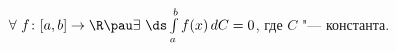 
	$\forall\  f\colon [a,b]\to\R\pau\exists\ \ds\int\limits_a^bf(x)\,dC=0$, где $C$ "--- константа.
	